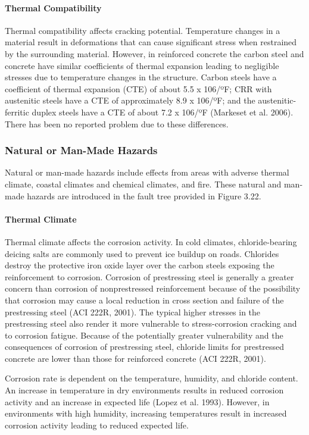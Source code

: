 \paragraph{Thermal Compatibility}
Thermal compatibility affects cracking potential. Temperature changes in a material result in deformations that
can cause significant stress when restrained by the surrounding material. However, in reinforced concrete the carbon
steel and concrete have similar coefficients of thermal expansion leading to negligible stresses due to temperature
changes in the structure. Carbon steels have a coefficient of thermal expansion (CTE) of about 5.5 x 106/ºF; CRR
with austenitic steels have a CTE of approximately 8.9 x 106/ºF; and the austenitic-ferritic duplex steels have a CTE
of about 7.2 x 106/ºF (Markeset et al. 2006). There has been no reported problem due to these differences.

\subsubsection{Natural or Man-Made Hazards}
Natural or man-made hazards include effects from areas with adverse thermal climate, coastal climates and
chemical climates, and fire. These natural and man-made hazards are introduced in the fault tree provided in Figure
3.22.
\paragraph{Thermal Climate}
Thermal climate affects the corrosion activity. In cold climates, chloride-bearing deicing salts are commonly
used to prevent ice buildup on roads. Chlorides destroy the protective iron oxide layer over the carbon steels
exposing the reinforcement to corrosion. Corrosion of prestressing steel is generally a greater concern than corrosion
of nonprestressed reinforcement because of the possibility that corrosion may cause a local reduction in cross section
and failure of the prestressing steel (ACI 222R, 2001). The typical higher stresses in the prestressing steel also render
it more vulnerable to stress-corrosion cracking and to corrosion fatigue. Because of the potentially greater vulnerability and the consequences of corrosion of prestressing steel, chloride limits for prestressed concrete are
lower than those for reinforced concrete (ACI 222R, 2001).

Corrosion rate is dependent on the temperature, humidity, and chloride content. An increase in temperature in
dry environments results in reduced corrosion activity and an increase in expected life (Lopez et al. 1993). However,
in environments with high humidity, increasing temperatures result in increased corrosion activity leading to reduced
expected life.

